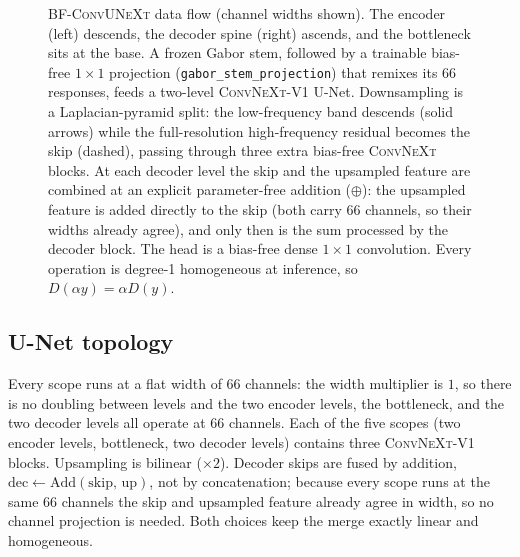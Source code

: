 \documentclass{article}
\newcommand{\model}{\textsc{BF-ConvUNeXt}}
\newcommand{\convnext}{\textsc{ConvNeXt}}
\begin{document}
\begin{figure}[H]
{%
}
\caption{\model{} data flow (channel widths shown). The encoder (left) descends, the decoder spine (right) ascends, and the bottleneck sits at the base. A frozen Gabor stem, followed by a trainable bias-free $1{\times}1$ projection (\texttt{gabor\_stem\_projection}) that remixes its $66$ responses, feeds a two-level \convnext{}-V1 U-Net. Downsampling is a Laplacian-pyramid split: the low-frequency band descends (solid arrows) while the full-resolution high-frequency residual becomes the skip (dashed), passing through three extra bias-free \convnext{} blocks. At each decoder level the skip and the upsampled feature are combined at an explicit parameter-free addition ($\oplus$): the upsampled feature is added directly to the skip (both carry $66$ channels, so their widths already agree), and only then is the sum processed by the decoder block. The head is a bias-free dense $1{\times}1$ convolution. Every operation is degree-1 homogeneous at inference, so $D(\alpha y)=\alpha D(y)$.}
\label{fig:arch}
\end{figure}

\subsection{U-Net topology}
Every scope runs at a flat width of $66$ channels: the width multiplier is $1$, so there is no doubling between levels and the two encoder levels, the bottleneck, and the two decoder levels all operate at $66$ channels. Each of the five scopes (two encoder levels, bottleneck, two decoder levels) contains three \convnext{}-V1 blocks. Upsampling is bilinear ($\times 2$). Decoder skips are fused by addition, $\mathrm{dec} \leftarrow \mathrm{Add}(\mathrm{skip},\, \mathrm{up})$, not by concatenation; because every scope runs at the same $66$ channels the skip and upsampled feature already agree in width, so no channel projection is needed. Both choices keep the merge exactly linear and homogeneous.
\end{document}
